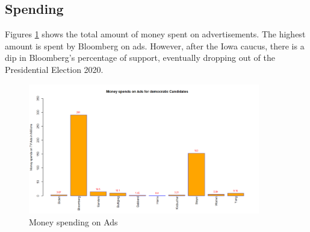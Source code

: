 \subsection{Spending}
Figures \ref{MoneyspendinAds} shows the total amount of money spent on advertisements. The highest amount is spent by Bloomberg on ads. However, after the Iowa caucus, there is a dip in Bloomberg's percentage of support, eventually dropping out of the Presidential Election 2020. 

\begin{figure}[H]
    \centering
    \includegraphics[width=0.9\textwidth]{figures/MoneyspendinAds.png}
    \caption{Money spending on Ads}
    \label{MoneyspendinAds}
\end{figure}


